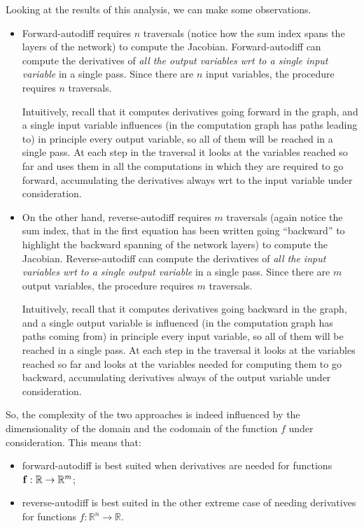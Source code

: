 Looking at the results of this analysis, we can make some observations.
\begin{itemize}
    \item  Forward-autodiff requires $n$ traversals (notice how the sum index spans the layers of the network) to compute the Jacobian. 
    Forward-autodiff can compute the derivatives of \emph{all the output variables wrt to a single input variable} in a single pass. 
    Since there are $n$ input variables, the procedure requires $n$ traversals.
    
    Intuitively, recall that it computes derivatives going forward in the graph, and a single input variable influences (in the computation graph has paths leading to) in principle every output variable, so all of them will be reached in a single pass. At each step in the traversal it looks at the variables reached so far and uses them in all the computations in which they are required to go forward, accumulating the derivatives always wrt to the input variable under consideration.

    \item On the other hand, reverse-autodiff requires $m$ traversals (again notice the sum index, that in the first equation has been written going ``backward'' to highlight the backward spanning of the network layers) to compute the Jacobian.
    Reverse-autodiff can compute the derivatives of \emph{all the input variables wrt to a single output variable} in a single pass.  
    Since there are $m$ output variables, the procedure requires $m$ traversals.
    
    Intuitively, recall that it computes derivatives going backward in the graph, and a single output variable is influenced (in the computation graph has paths coming from) in principle every input variable, so all of them will be reached in a single pass. At each step in the traversal it looks at the variables reached so far and looks at the variables needed for computing them to go backward, accumulating derivatives always of the output variable under consideration.
\end{itemize} 

So, the complexity of the two approaches is indeed influenced by the dimensionality of the domain and the codomain of the function $f$ under consideration. This means that: 
\begin{itemize}
    \item forward-autodiff is best suited when derivatives are needed for functions $\vb{f}: \mathbb{R} \to \mathbb{R}^m$;
    \item reverse-autodiff is best suited in the other extreme case of needing derivatives for functions $f: \mathbb{R}^n \to \mathbb{R}$. 
\end{itemize}